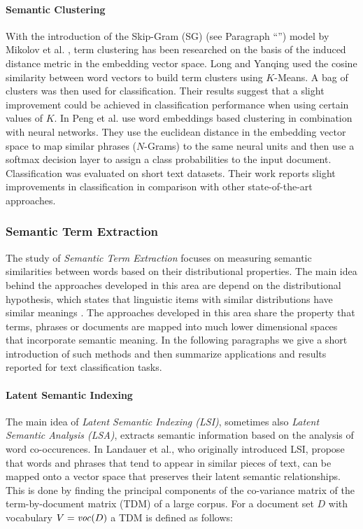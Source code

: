 \paragraph{Semantic Clustering}
\label{par:semantic-clustering}
 With the introduction of the Skip-Gram (SG) (see Paragraph
 ``'') model by Mikolov et al.
 \cite{mikolov2013distributed}, term clustering has been researched on the basis 
 of the induced distance metric in the embedding
 vector space. Long and Yanqing \cite{ma2015using} used the cosine similarity
 between word vectors to build term clusters using $K$-Means. A bag of clusters
 was then used for classification. Their results suggest that a slight
 improvement could be achieved in classification performance when using certain values of $K$.
 In \cite{wang2016semantic} Peng et al. use word embeddings based clustering in
 combination with neural networks. They use the euclidean distance in the
 embedding vector space to map similar phrases ($N$-Grams) to the same neural
 units and then use a softmax decision layer to assign a class probabilities to
 the input document. Classification was evaluated on short text datasets.
 Their work reports slight improvements in classification in comparison
 with other state-of-the-art approaches.
  
 \subsubsection{Semantic Term Extraction}
 
 The study of \emph{Semantic Term Extraction} focuses on measuring semantic
 similarities between words based on their distributional properties. The
 main idea behind the approaches developed in this area are depend on the
 distributional hypothesis, which states that linguistic items with similar
 distributions have similar meanings \cite{harris1954distributional}. The
 approaches developed in this area share the property that terms, phrases or
 documents are mapped into much lower dimensional spaces that incorporate semantic
 meaning. In the following paragraphs we give a short introduction of
 such methods and then summarize applications and results reported for text
 classification tasks.
 
 \paragraph{Latent Semantic Indexing}
 
The main idea of \emph{Latent Semantic Indexing (LSI)}, sometimes also 
\emph{Latent Semantic Analysis (LSA)}, extracts semantic information based on the analysis of
word co-occurences. In \cite{landauer1998introduction} Landauer et al., who
originally introduced LSI, propose that words and phrases that tend to
appear in similar pieces of text, can be mapped onto a vector space that preserves
their latent semantic relationships. This is done by finding the principal components of the 
co-variance matrix of the term-by-document matrix (TDM) of a large corpus. For a document
set $D$ with vocabulary $V = \mathit{voc}(D)$ a TDM is defined as follows:

